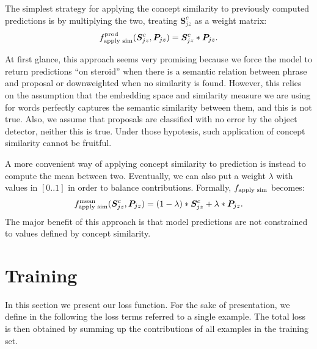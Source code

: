 \documentclass{article}
\begin{document}
The simplest strategy for applying the concept similarity to
previously computed predictions is by multiplying the two, treating
$\bm{S}^c_{jz}$ as a weight matrix:
\begin{equation}
  f_{\text{apply sim}}^{\text{prod}} (\bm{S}^c_{jz}, \bm{P}_{jz}) = \bm{S}^c_{jz} * \bm{P}_{jz}.
\end{equation}

At first glance, this approach seems very promising because we force
the model to return predictions ``on steroid'' when there is a
semantic relation between phrase and proposal or downweighted when no
similarity is found. However, this relies on the assumption that the
embedding space and similarity measure we are using for words
perfectly captures the semantic similarity between them, and this is
not true. Also, we assume that proposals are classified with no error
by the object detector, neither this is true. Under those hypotesis,
such application of concept similarity cannot be fruitful. 

A more convenient way of applying concept similarity to prediction is
instead to compute the mean between two. Eventually, we can also put a
weight $\lambda$ with values in $[0 .. 1]$ in order to balance
contributions. Formally, $f_{\text{apply sim}}$ becomes:
\begin{equation}
  f_{\text{apply sim}}^{\text{mean}} (\bm{S}^c_{jz}, \bm{P}_{jz}) = (1 - \lambda) * \bm{S}^c_{jz} + \lambda * \bm{P}_{jz}.
\end{equation}
The major benefit of this approach is that model predictions are not
constrained to values defined by concept similarity.

\section{Training}

In this section we present our loss function. For the sake of
presentation, we define in the following the loss terms referred to a
single example. The total loss is then obtained by summing up the
contributions of all examples in the training set.
\end{document}
